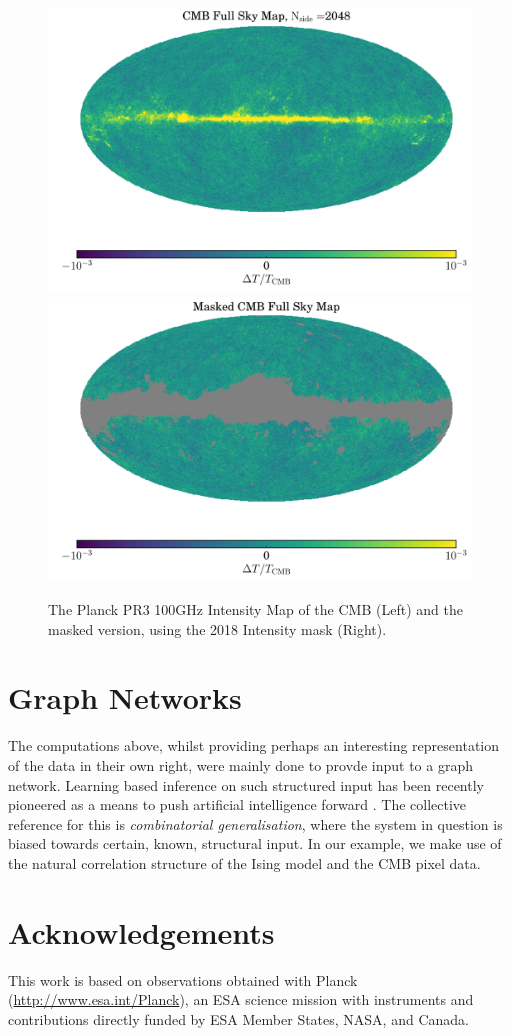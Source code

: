 \documentclass[11pt]{article}
\numberwithin{equation}{section}
\numberwithin{figure}{section}
\numberwithin{table}{section}
\numberwithin{definition}{section}
\begin{document}
\begin{figure}[t]
\begin{center}
\includegraphics[width=0.49\linewidth]{figures/cmbfullsky.pdf} \hfill
\includegraphics[width=0.49\linewidth]{figures/maskedfullsky.pdf}
\caption{The Planck PR3 100GHz Intensity Map of the CMB (Left) and the masked version, using the 2018 Intensity mask (Right).}\label{fig:cmbmaps}
\end{center}
\end{figure}


\section{Graph Networks}


The computations above, whilst providing perhaps an interesting representation of the data in their own right, were mainly done to provde input to a graph network. Learning based inference on such structured input has been recently pioneered as a means to push artificial intelligence forward \citep{DBLP:journals/corr/abs-1806-01261}. The collective reference for this is \textit{combinatorial generalisation}, where the system in question is biased towards certain, known, structural input. In our example, we make use of the natural correlation structure of the Ising model and the CMB pixel data.



\section*{Acknowledgements}



This work is based on observations obtained with Planck (\href{http://www.esa.int/Planck}{http://www.esa.int/Planck}), an ESA science mission with instruments and contributions directly funded by ESA Member States, NASA, and Canada.




\end{document}
